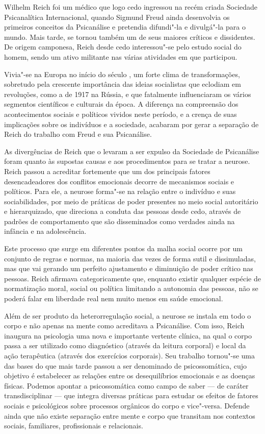 Wilhelm Reich foi um médico que logo cedo ingressou na recém criada
Sociedade Psicanalítica Internacional, quando Sigmund Freud ainda
desenvolvia os primeiros conceitos da Psicanálise e pretendia difundi"-la
e divulgá"-la para o mundo. Mais tarde, se tornou também um de seus
maiores críticos e dissidentes. De origem camponesa, Reich desde cedo
interessou"-se pelo estudo social do homem, sendo um ativo militante nas
várias atividades em que participou.

Vivia"-se na Europa no início do século , um forte clima de
transformações, sobretudo pela crescente importância das ideias
socialistas que eclodiam em revoluções, como a de 1917 na Rússia, e que
fatalmente influenciaram os vários segmentos científicos e culturais da
época. A diferença na compreensão dos acontecimentos sociais e políticos
vividos neste período, e a crença de suas implicações sobre os
indivíduos e a sociedade, acabaram por gerar a separação de Reich do
trabalho com Freud e sua Psicanálise.

As divergências de Reich que o levaram a ser expulso da Sociedade de
Psicanálise foram quanto às supostas causas e aos procedimentos para se
tratar a neurose. Reich passou a acreditar fortemente que um dos
principais fatores desencadeadores dos conflitos emocionais decorre de
mecanismos sociais e políticos. Para ele, a neurose forma"-se na relação
entre o indivíduo e suas sociabilidades, por meio de práticas de poder
presentes no meio social autoritário e hierarquizado, que direciona a
conduta das pessoas desde cedo, através de padrões de comportamento que
são disseminados como verdades ainda na infância e na adolescência.

Este processo que surge em diferentes pontos da malha social ocorre por
um conjunto de regras e normas, na maioria das vezes de forma sutil e
dissimuladas, mas que vai gerando um perfeito ajustamento e diminuição
de poder crítico nas pessoas. Reich afirmava categoricamente que,
enquanto existir qualquer espécie de normatização moral, social ou
política limitando a autonomia das pessoas, não se poderá falar em
liberdade real nem muito menos em saúde emocional.

Além de ser produto da heterorregulação social, a neurose se instala em
todo o corpo e não apenas na mente como acreditava a Psicanálise. Com
isso, Reich inaugura na psicologia uma nova e importante vertente
clínica, na qual o corpo passa a ser utilizado como diagnóstico (através
da leitura corporal) e local da ação terapêutica (através dos exercícios
corporais). Seu trabalho tornou"-se uma das bases do que mais tarde
passou a ser denominado de psicossomática, cujo objetivo é estabelecer
as relações entre os desequilíbrios emocionais e as doenças físicas.
Podemos apontar a psicossomática como campo de saber --- de caráter
transdisciplinar --- que integra diversas práticas para estudar os efeitos
de fatores sociais e psicológicos sobre processos orgânicos do corpo e
vice"-versa. Defende ainda que não existe separação entre mente e corpo
que transitam nos contextos sociais, familiares, profissionais e
relacionais.

